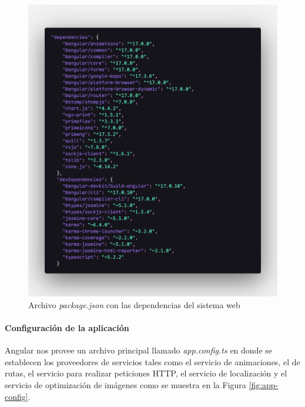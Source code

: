 \begin{figure}[H]
    \centering
    \includegraphics[width=1\textwidth]{resources/images/dependencias-angular}
    \caption{Archivo \textit{package.json} con las dependencias del sistema web}
    \label{fig:package-json}
\end{figure}

\paragraph{Configuración de la aplicación}

Angular nos provee un archivo principal llamado \textit{app.config.ts} en donde se establecen los proveedores de servicios tales como el servicio de animaciones, el de rutas, el servicio para realizar peticiones HTTP, el servicio de localización y el servicio de optimización de imágenes como se muestra en la Figura \ref{fig:app-config}.


